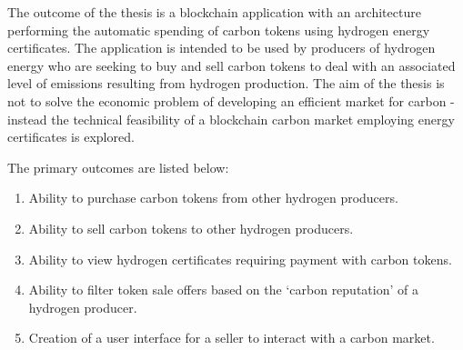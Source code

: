 The outcome of the thesis is a blockchain application with an architecture
performing the automatic spending of carbon tokens using hydrogen
energy certificates. The application is intended to be used by
producers of hydrogen energy who are seeking to buy and sell carbon
tokens to deal with an associated level of emissions resulting from
hydrogen production. The aim of the thesis is not
to solve the economic problem of developing an efficient
market for carbon - instead the technical feasibility of
a blockchain carbon market employing energy
certificates is explored.

The primary outcomes are listed below:
\begin{enumerate}
    \item Ability to purchase carbon tokens from other hydrogen producers.
    \item Ability to sell carbon tokens to other hydrogen producers.
    \item Ability to view hydrogen certificates requiring payment with
          carbon tokens.
    \item Ability to filter token sale offers based on the `carbon reputation'
          of a hydrogen producer.
    \item Creation of a user interface for a seller to interact with a carbon
          market.
\end{enumerate}